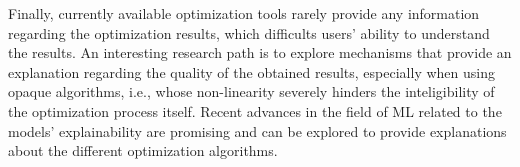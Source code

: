 
Finally, currently available optimization tools rarely provide any information regarding the optimization results, which difficults users' ability to understand the results. An interesting research path is to explore mechanisms that provide an explanation regarding the quality of the obtained results, especially when using opaque algorithms, i.e., whose non-linearity severely hinders the inteligibility of the optimization process itself. Recent advances in the field of \ac{ML} related to the models' explainability are promising and can be explored to provide explanations about the different optimization algorithms. 
	
	
	
	
	